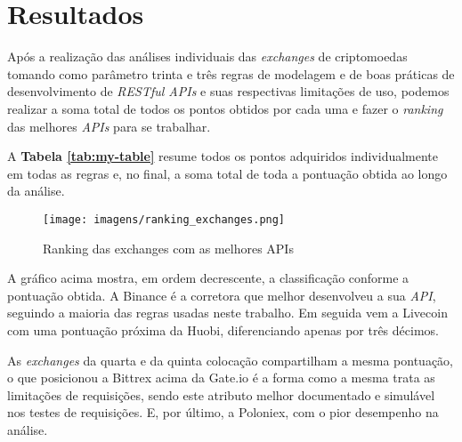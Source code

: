 \chapter{Resultados}
\label{chap:resultados}

Após a realização das análises individuais das \textit{exchanges} de criptomoedas tomando como parâmetro trinta e três regras de modelagem e de boas práticas de desenvolvimento de \textit{RESTful APIs} e suas respectivas limitações de uso, podemos realizar a soma total de todos os pontos obtidos por cada uma e fazer o \textit{ranking} das melhores \textit{APIs} para se trabalhar.

A \textbf{Tabela \ref{tab:my-table}} resume todos os pontos adquiridos individualmente em todas as regras e, no final, a soma total de toda a pontuação obtida ao longo da análise.

\begin{figure}[h]
	\centering
	\texttt{[image: imagens/ranking\_exchanges.png]}
	\caption{Ranking das exchanges com as melhores APIs}
	\label{fig:ranking-apis-exchanges}
\end{figure}

A gráfico acima mostra, em ordem decrescente, a classificação conforme a pontuação obtida. A Binance é a corretora que melhor desenvolveu a sua \textit{API}, seguindo a maioria das regras usadas neste trabalho. Em seguida vem a Livecoin com uma pontuação próxima da Huobi, diferenciando apenas por três décimos.

As \textit{exchanges} da quarta e da quinta colocação compartilham a mesma pontuação, o que posicionou a Bittrex acima da Gate.io é a forma como a mesma trata as limitações de requisições, sendo este atributo melhor documentado e simulável nos testes de requisições. E, por último, a Poloniex, com o pior desempenho na análise. 

